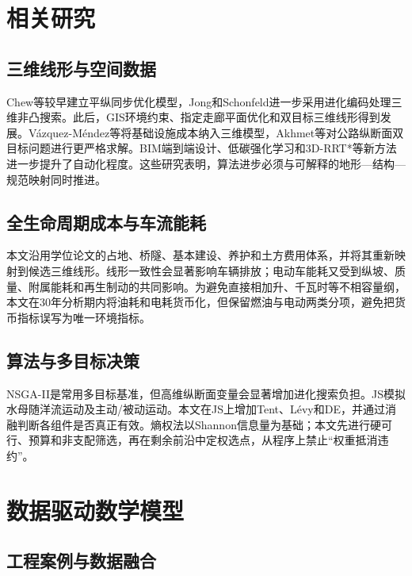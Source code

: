 \documentclass[preprint,12pt]{elsarticle}
\begin{document}
\section{相关研究}

\subsection{三维线形与空间数据}

Chew等\cite{chew1989}较早建立平纵同步优化模型，Jong和Schonfeld\cite{jong2003}进一步采用进化编码处理三维非凸搜索。此后，GIS环境约束、指定走廊平面优化和双目标三维线形得到发展\cite{kang2012,mondal2015,hirpa2016}。V\'azquez-M\'endez等\cite{vazquez2018}将基础设施成本纳入三维模型，Akhmet等\cite{akhmet2022}对公路纵断面双目标问题进行更严格求解。BIM端到端设计、低碳强化学习和3D-RRT*等新方法进一步提升了自动化程度\cite{han2023,he2023,pu2024}。这些研究表明，算法进步必须与可解释的地形—结构—规范映射同时推进。

\subsection{全生命周期成本与车流能耗}

本文沿用学位论文\cite{lin2025}的占地、桥隧、基本建设、养护和土方费用体系，并将其重新映射到候选三维线形。线形一致性会显著影响车辆排放\cite{llopis2019}；电动车能耗又受到纵坡、质量、附属能耗和再生制动的共同影响\cite{dimartino2022}。为避免直接相加升、千瓦时等不相容量纲，本文在30年分析期内将油耗和电耗货币化，但保留燃油与电动两类分项，避免把货币指标误写为唯一环境指标。

\subsection{算法与多目标决策}

NSGA-II是常用多目标基准\cite{deb2002}，但高维纵断面变量会显著增加进化搜索负担。JS模拟水母随洋流运动及主动/被动运动\cite{chou2021}。本文在JS上增加Tent、L\'evy和DE\cite{storn1997}，并通过消融判断各组件是否真正有效。熵权法以Shannon信息量为基础\cite{shannon1948}；本文先进行硬可行、预算和非支配筛选，再在剩余前沿中定权选点，从程序上禁止“权重抵消违约”。

\section{数据驱动数学模型}

\subsection{工程案例与数据融合}
\end{document}

